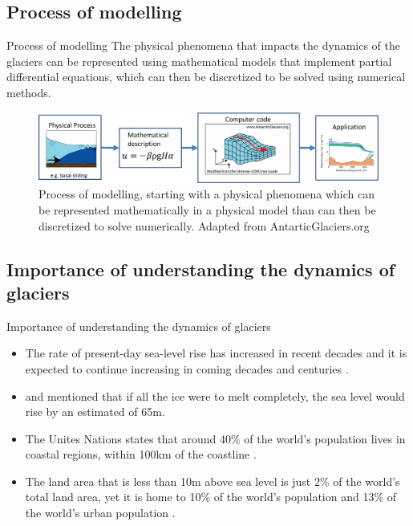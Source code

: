 \documentclass[11pt]{beamer}
\begin{document}
	\subsection{Process of modelling}
		\begin{frame}{Process of modelling}
		\justifying
		The physical phenomena that impacts the dynamics of the glaciers can be represented using mathematical models that implement partial differential equations, which can then be discretized to be solved using numerical methods.
		\begin{figure}
		\centering
		\includegraphics[scale=0.4]{../fig/Numerical_modelling_scheme.png}
		\caption{Process of modelling, starting with a physical phenomena which can be represented mathematically in a physical model than can then be discretized to solve numerically. Adapted from AntarticGlaciers.org}
		\label{Modelling}
		\end{figure}
		\end{frame}
	\subsection{Importance of understanding the dynamics of glaciers}
		\begin{frame}{Importance of understanding the dynamics of glaciers}
		\justifying
		\begin{itemize}
			\item The rate of present-day sea-level rise has increased in recent decades and it is expected to continue increasing in coming decades and centuries \cite[]{clark2015recent}.
			\item \cite{morlighem2017bedmachine} and \cite{haywood2011pliocene} mentioned that if all the ice were to melt completely, the sea level would rise by an estimated of 65m.
			\item The Unites Nations states that around 40\% of the world's population lives in coastal regions, within 100km of the coastline \cite[]{barbier2015climate, montgomery2007united}.
			\item The land area that is less than 10m above sea level is just 2\% of the world's total land area, yet it is home to 10\% of the world's population and 13\% of the world's urban population \cite[]{nevermann2023land}.
		\end{itemize}
		\end{frame}
\end{document}
